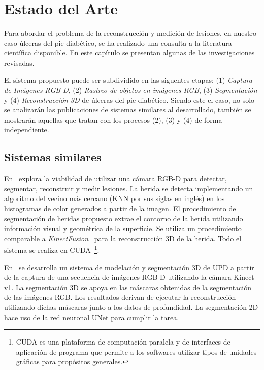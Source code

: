 \chapter{Estado del Arte}\label{chapter:state-of-the-art}

Para abordar el problema de la reconstrucción y medición de lesiones, en nuestro caso úlceras del pie diabético, se ha realizado una consulta a la literatura científica disponible. En este capítulo se presentan algunas de las investigaciones revisadas.

El sistema propuesto puede ser subdividido en las siguentes etapas: (1) \textit{Captura de Imágenes RGB-D}, (2) \textit{Rastreo de objetos en imágenes RGB}, (3)
\textit{Segmentación}  y (4) \textit{Reconstrucción 3D} de úlceras del pie diabético. Siendo este el caso, no solo se analizarán las publicaciones de sistemas similares al desarrollado, también se mostrarán aquellas que tratan con los procesos (2), (3) y (4) de forma independiente.

\section{Sistemas similares}

En~\cite{filko2018wound} explora la viabilidad de utilizar una cámara RGB-D para detectar, segmentar, reconstruir y medir lesiones. La herida se detecta implementando un algoritmo del vecino más cercano (KNN por sus siglas en inglés) en los histogramas de color generados a partir de la imagen. El procedimiento de segmentación de heridas propuesto extrae el contorno de la herida utilizando información visual y geométrica de la superficie. Se utiliza un procedimiento comparable a \textit{KinectFusion}~\cite{izadi2011kinectfusion} para la reconstrucción 3D de la herida. Todo el sistema se realiza en CUDA~\footnote{CUDA es una plataforma de computación paralela y de interfaces de aplicación de programa que permite a los softwares utilizar tipos de unidades gráficas para propósitos generales.}.

En~\cite{ching2022segm3d} se desarrolla un sistema de modelación y segmentación 3D de UPD a partir de la captura de una secuencia de imágenes RGB-D utilizando la cámara Kinect v1. La segmentación 3D se apoya en las máscaras obtenidas de la segmentación de las imágenes RGB. Los resultados derivan de ejecutar la reconstrucción utilizando dichas máscaras junto a los datos de profundidad. La segmentación 2D hace uso de la red neuronal UNet para cumplir la tarea.

